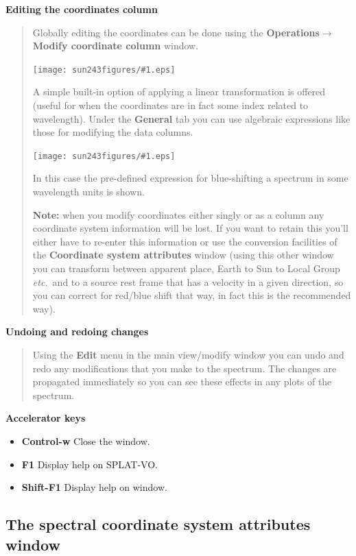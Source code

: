 \documentclass[twoside,11pt]{article}
\newcommand{\htmladdimg}[1]{}
\newcommand{\latexhtml}[2]{#1}
\renewcommand{\_}{\texttt{\symbol{95}}}
\newcommand{\SPLAT}{\textsf{SPLAT-VO}}
\newcommand{\mainfigure}[1]
{\begin{center}
 \latexhtml{\texttt{[image: sun243\_figures/\#1.eps]}}{\htmladdimg{#1.gif}}
 \end{center}
}
\newcommand{\menuitem}[1]{\textbf{#1}}
\newcommand{\submenuitem}[2]{\latexhtml{\textbf{#1$\rightarrow$#2}}{\textbf{#1->#2}}}
\newcommand{\labelitem}[1]{\textbf{#1}}
\newcommand{\etc}{\textit{etc.}}
\newcommand{\subheading}[1]{\textbf{\large{#1}}}
\begin{document}
\subheading{Editing the coordinates column}
\begin{quote}
 Globally editing the coordinates can be done using the
 \submenuitem{Operations}{Modify coordinate column} window.

 \mainfigure{coordeditwindow}

 A simple built-in option of applying a linear transformation is
 offered (useful for when the coordinates are in fact some index
 related to wavelength). Under the \labelitem{General} tab you can
 use algebraic expressions like those for modifying the data columns.

 \mainfigure{coordeditwindow2}

 In this case the pre-defined expression for blue-shifting a spectrum
 in some wavelength units is shown.

 \labelitem{Note:} when you modify coordinates either singly or as a
 column any coordinate system information will be lost. If you want to
 retain this you'll either have to re-enter this information or use
 the conversion facilities of the \labelitem{Coordinate system
 attributes} window (using this other window you can transform between
 apparent place, Earth to Sun to Local Group \etc\ and to a source
 rest frame that has a velocity in a given direction, so you can
 correct for red/blue shift that way, in fact this is the recommended way).

\end{quote}

\subheading{Undoing and redoing changes}
\begin{quote}
Using the \menuitem{Edit} menu in the main view/modify window you can
undo and redo any modifications that you make to the spectrum. The
changes are propagated immediately so you can see these effects in any
plots of the spectrum.
\end{quote}

\subheading{Accelerator keys}

\begin{itemize}
\item \labelitem{Control-w} Close the window.
\item \labelitem{F1} Display help on \SPLAT.     
\item \labelitem{Shift-F1} Display help on window.
\end{itemize}

\newpage
\subsection{The spectral coordinate system attributes window}
\end{document}
